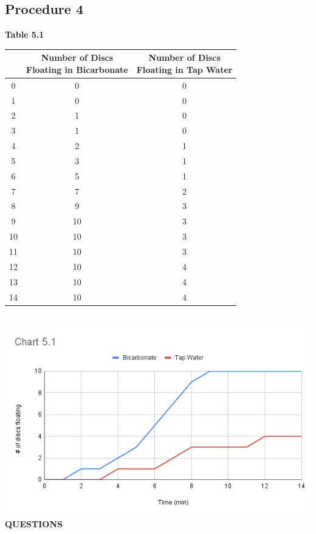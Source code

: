 \documentclass{article}
\begin{document}
\subsection{Procedure 4}
\textbf{Table 5.1} \\
\begin{tabular} { | c | c | c | }
	& \makecell{Number of Discs \\ Floating in Bicarbonate} & \makecell{Number of Discs  \\ Floating in Tap Water} \\
	\hline
	0 & 0 & 0 \\
	\hline
	1 & 0 & 0 \\
	\hline
	2 & 1 & 0 \\
	\hline
	3 & 1 & 0 \\
	\hline
	4 & 2 & 1 \\
	\hline
	5 & 3 & 1 \\
	\hline
	6 & 5 & 1 \\
	\hline
	7 & 7 & 2 \\
	\hline
	8 & 9 & 3 \\
	\hline
	9 & 10 & 3 \\
	\hline
	10 & 10 & 3 \\
	\hline
	11 & 10 & 3 \\
	\hline
	12 & 10 & 4 \\
	\hline
	13 & 10 & 4 \\
	\hline
	14 & 10 & 4
\end{tabular} \\
\includegraphics[width=\textwidth]{chart_5_1.png}
\textbf{QUESTIONS}
\end{document}
